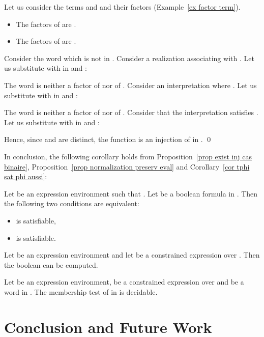 \documentclass[a4paper]{llncs}
\begin{document}
  \begin{example}
    Let us consider the terms  and  and their factors (Example~\ref{ex factor term}).
      \begin{itemize}
         \item The factors of  are .
         \item The factors of  are . 
     \end{itemize}
     Consider the word  which is not in . Consider a realization  associating  with . Let us substitute  with  in  and :
        
        The word  is neither a factor of  nor of . Consider an interpretation  where . Let us substitute  with  in  and :
        
        The word  is neither a factor of  nor of . Consider that the interpretation  satisfies . Let us substitute  with  in  and :
        
        Hence, since  and  are distinct, the function  is an injection of   in .     
    \qed
  \end{example}
  
  In conclusion, the following corollary holds from Proposition~\ref{prop exist inj cas binaire}, Proposition~\ref{prop normalization preserv eval} and Corollary~\ref{cor tphi sat phi aussi}:
  
  \begin{corollary}
    Let  be an expression environment such that . Let  be a boolean formula in . Then the  following two conditions are equivalent:
    \begin{itemize}
      \item  is satisfiable,
\item  is satisfiable.
    \end{itemize}
  \end{corollary}
  
  \begin{corollary}
    Let  be an expression environment and let  be a constrained expression over . Then the boolean  can be computed.
  \end{corollary}
  
  \begin{corollary}
    Let  be an expression environment,  be a constrained expression over  and  be a word in . The membership test of  in  is decidable.
  \end{corollary}
  


\section{Conclusion and Future Work}
\end{document}

